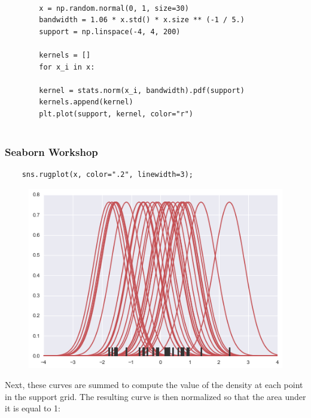 \documentclass{beamer}
\begin{document}
\begin{frame}[fragile]
	\begin{framed}
		\begin{verbatim}
		
		x = np.random.normal(0, 1, size=30)
		bandwidth = 1.06 * x.std() * x.size ** (-1 / 5.)
		support = np.linspace(-4, 4, 200)
		
		kernels = []
		for x_i in x:
		
		kernel = stats.norm(x_i, bandwidth).pdf(support)
		kernels.append(kernel)
		plt.plot(support, kernel, color="r")
		
		\end{verbatim}
	\end{framed}
\end{frame}
\begin{frame}[fragile]
	\frametitle{Seaborn Workshop}
	\large
	\begin{verbatim}
	sns.rugplot(x, color=".2", linewidth=3);
	\end{verbatim}
	\begin{figure}
		\centering
		\includegraphics[width=0.7\linewidth]{images/distributions_16_0}
	\end{figure}
	Next, these curves are summed to compute the value of the density at each point in the support grid. The resulting curve is then normalized so that the area under it is equal to 1:
	
\end{frame}
\end{document}
